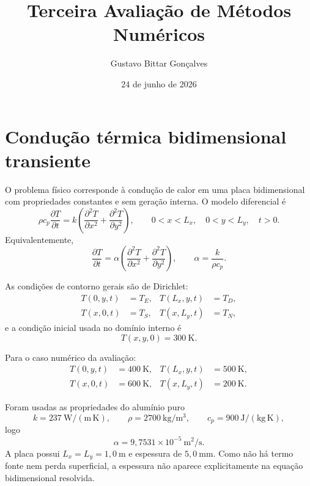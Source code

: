 \documentclass[12pt,a4paper]{article}
\title{Terceira Avaliação de Métodos Numéricos}
\author{Gustavo Bittar Gonçalves}
\date{24 de junho de 2026}
\begin{document}
\maketitle

\section{Condução térmica bidimensional transiente}

O problema físico corresponde à condução de calor em uma placa bidimensional com propriedades constantes e sem geração interna. O modelo diferencial é
\begin{equation}
    \rho c_p \frac{\partial T}{\partial t}
    =
    k\left(
        \frac{\partial^2 T}{\partial x^2}
        +
        \frac{\partial^2 T}{\partial y^2}
    \right),
    \qquad
    0<x<L_x,\quad 0<y<L_y,\quad t>0.
\end{equation}
Equivalentemente,
\begin{equation}
    \frac{\partial T}{\partial t}
    =
    \alpha\left(
        \frac{\partial^2 T}{\partial x^2}
        +
        \frac{\partial^2 T}{\partial y^2}
    \right),
    \qquad
    \alpha=\frac{k}{\rho c_p}.
\end{equation}

As condições de contorno gerais são de Dirichlet:
\begin{align}
    T(0,y,t)&=T_E, & T(L_x,y,t)&=T_D,\\
    T(x,0,t)&=T_S, & T(x,L_y,t)&=T_N,
\end{align}
e a condição inicial usada no domínio interno é
\begin{equation}
    T(x,y,0)=300\ \mathrm{K}.
\end{equation}

Para o caso numérico da avaliação:
\begin{align}
    T(0,y,t)&=400\ \mathrm{K},&
    T(L_x,y,t)&=500\ \mathrm{K},\\
    T(x,0,t)&=600\ \mathrm{K},&
    T(x,L_y,t)&=200\ \mathrm{K}.
\end{align}

Foram usadas as propriedades do alumínio puro
\[
    k=237\ \mathrm{W/(m\,K)},\qquad
    \rho=2700\ \mathrm{kg/m^3},\qquad
    c_p=900\ \mathrm{J/(kg\,K)},
\]
logo
\[
    \alpha=9{,}7531\times 10^{-5}\ \mathrm{m^2/s}.
\]
A placa possui $L_x=L_y=1{,}0\ \mathrm{m}$ e espessura de $5{,}0\ \mathrm{mm}$. Como não há termo fonte nem perda superficial, a espessura não aparece explicitamente na equação bidimensional resolvida.
\end{document}
